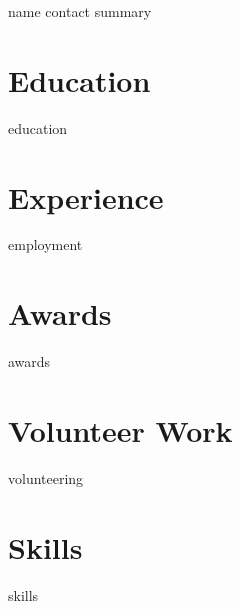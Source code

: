 \documentclass[10.5pt]{article}
\begin{document}
{name}
{contact}
{summary}


\section{Education}
{education}

\section{Experience}
{employment}

\section{Awards}
{awards}

\section{Volunteer Work}
{volunteering}


\section{Skills}
{skills}



\end{document}
